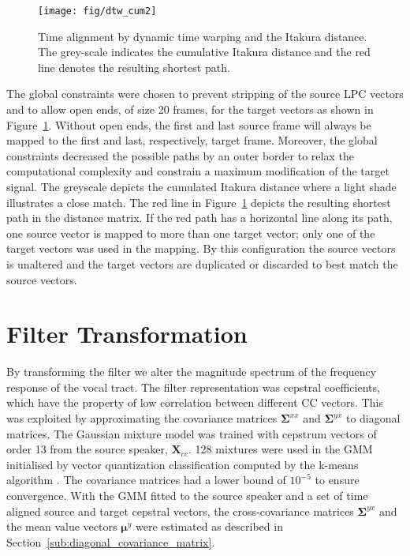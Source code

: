 \begin{figure}[htbp]
	\begin{center}
		\texttt{[image: fig/dtw\_cum2]}
		\caption{Time alignment by dynamic time warping and the Itakura distance. The grey-scale indicates the cumulative Itakura distance and the red line denotes the resulting shortest path.}
		\label{fig:dtw}
	\end{center}
\end{figure}
The global constraints were chosen to prevent stripping of the source LPC vectors and to allow open ends, of size 20 frames, for the target vectors as shown in Figure~\ref{fig:dtw}. Without open ends, the first and last source frame will always be mapped to the first and last, respectively, target frame. Moreover, the global constraints decreased the possible paths by an outer border to relax the computational complexity and constrain a maximum modification of the target signal. The greyscale depicts the cumulated Itakura distance where a light shade illustrates a close match. The red line in Figure~\ref{fig:dtw} depicts the resulting shortest path in the distance matrix. If the red path has a horizontal line along its path, \ie one source vector is mapped to more than one target vector; only one of the target vectors was used in the mapping. By this configuration the source vectors is unaltered and the target vectors are duplicated or discarded to best match the source vectors.



\section{Filter Transformation} %
\label{sec:filter_transformation}

By transforming the filter we alter the magnitude spectrum of the frequency response of the vocal tract. The filter representation was cepstral coefficients, which have the property of low correlation between different CC vectors. This was exploited by approximating the covariance matrices $\mathbf{\Sigma}^{xx}$ and $\mathbf{\Sigma}^{yx}$ to diagonal matrices. The Gaussian mixture model was trained with cepstrum vectors of order 13 from the source speaker, $\mathbf{X}_{cc}$. 128 mixtures were used in the GMM initialised by vector quantization classification computed by the k-means algorithm \cite{linde80}. The covariance matrices had a lower bound of $10^{-5}$ to ensure convergence. With the GMM fitted to the source speaker and a set of time aligned source and target cepstral vectors, the cross-covariance matrices $\mathbf{\Sigma}^{yx}$ and the mean value vectors $\boldsymbol{\mu}^y$ were estimated as described in Section~\ref{sub:diagonal_covariance_matrix}.

